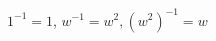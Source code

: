 \documentclass[preview]{standalone}
\begin{document}
\begin{center}
$1^{-1} = 1$, $w^{-1} = w^2, (w^2)^{-1} = w$
\end{center}
\end{document}
